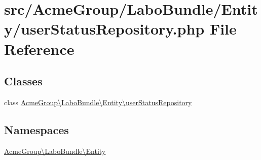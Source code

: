 \hypertarget{user_status_repository_8php}{\section{src/\+Acme\+Group/\+Labo\+Bundle/\+Entity/user\+Status\+Repository.php File Reference}
\label{user_status_repository_8php}
}
\subsection*{Classes}
\begin{DoxyCompactItemize}
\item 
class \hyperlink{class_acme_group_1_1_labo_bundle_1_1_entity_1_1user_status_repository}{Acme\+Group\textbackslash{}\+Labo\+Bundle\textbackslash{}\+Entity\textbackslash{}user\+Status\+Repository}
\end{DoxyCompactItemize}
\subsection*{Namespaces}
\begin{DoxyCompactItemize}
\item 
 \hyperlink{namespace_acme_group_1_1_labo_bundle_1_1_entity}{Acme\+Group\textbackslash{}\+Labo\+Bundle\textbackslash{}\+Entity}
\end{DoxyCompactItemize}
